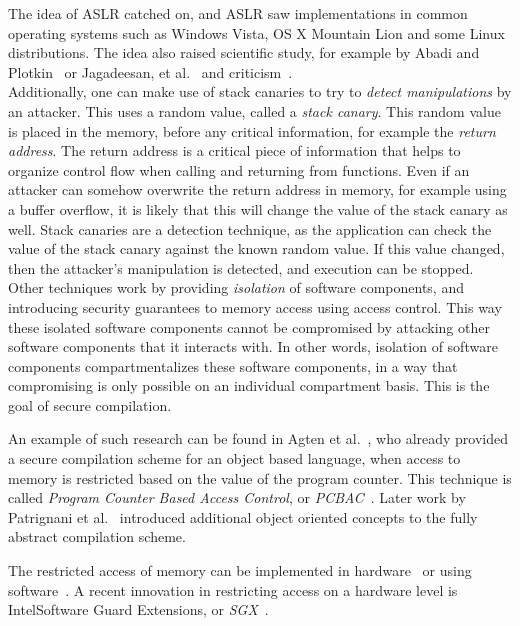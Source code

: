 The idea of ASLR catched on, and ASLR saw implementations in common operating systems such as Windows Vista, OS X Mountain Lion and some Linux distributions. 
The idea also raised scientific study, for example by Abadi and Plotkin~\cite{AbadiASLR} or Jagadeesan, et al.~\cite{Jagadeesan} and criticism~\cite{Shacham:2004:EAR:1030083.1030124,Strackx:2009:BMS:1519144.1519145}.
\\
Additionally, one can make use of stack canaries to try to \emph{detect manipulations} by an attacker. 
This uses a random value, called a \emph{stack canary}. 
This random value is placed in the memory, before any critical information, for example the \emph{return address}.
The return address is a critical piece of information that helps to organize control flow when calling and returning from functions.
Even if an attacker can somehow overwrite the return address in memory, for example using a buffer overflow\cite{OVSPaper}, it is likely that this will change the value of the stack canary as well.
Stack canaries are a detection technique, as the application can check the value of the stack canary against the known random value.
If this value changed, then the attacker's manipulation is detected, and execution can be stopped.
\\[1em]
Other techniques work by providing \emph{isolation} of software components, and introducing security guarantees to memory access using access control.
This way these isolated software components cannot be compromised by attacking other software components that it interacts with.
In other words, isolation of software components compartmentalizes these software components, in a way that compromising is only possible on an individual compartment basis.
This is the goal of secure compilation.

An example of such research can be found in Agten et al.~\cite{Agten:2012:SCM:2354412.2355247}, who already provided a secure compilation scheme for an object based language, when access to memory is restricted based on the value of the program counter. This technique is called \emph{Program Counter Based Access Control}, or \emph{PCBAC}~\cite{PCBAC}.
Later work by Patrignani et al.~\cite{Patrignani} introduced additional object oriented concepts to the fully abstract compilation scheme.

The restricted access of memory can be implemented in hardware~\cite{Sancus,SGX} or using software~\cite{Fides,Salus}.
A recent innovation in restricting access on a hardware level is Intel\textregistered Software Guard Extensions, or \emph{SGX}~\cite{SGX}.

